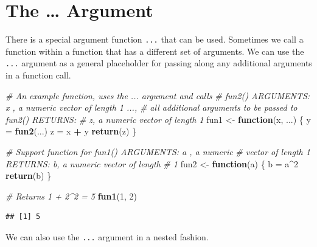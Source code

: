 \documentclass[
]{book}
\newenvironment{Shaded}{\begin{snugshade}}{\end{snugshade}}
\newcommand{\CommentTok}[1]{\textcolor[rgb]{0.56,0.35,0.01}{\textit{#1}}}
\newcommand{\ControlFlowTok}[1]{\textcolor[rgb]{0.13,0.29,0.53}{\textbf{#1}}}
\newcommand{\DecValTok}[1]{\textcolor[rgb]{0.00,0.00,0.81}{#1}}
\newcommand{\KeywordTok}[1]{\textcolor[rgb]{0.13,0.29,0.53}{\textbf{#1}}}
\newcommand{\NormalTok}[1]{#1}
\newcommand{\OperatorTok}[1]{\textcolor[rgb]{0.81,0.36,0.00}{\textbf{#1}}}
\newcommand{\StringTok}[1]{\textcolor[rgb]{0.31,0.60,0.02}{#1}}
\begin{document}
\hypertarget{the-argument}{%
\section{The \ldots{} Argument}\label{the-argument}}

There is a special argument function \texttt{...} that can be used. Sometimes we call a function within a function that has a different set of arguments. We can use the \texttt{...} argument as a general placeholder for passing along any additional arguments in a function call.

\begin{Shaded}
\begin{Highlighting}[]
\CommentTok{# An example function, uses the ... argument and calls}
\CommentTok{# fun2() ARGUMENTS: x , a numeric vector of length 1 ...,}
\CommentTok{# all additional arguments to be passed to fun2() RETURNS:}
\CommentTok{# z, a numeric vector of length 1}
\NormalTok{fun1 <-}\StringTok{ }\ControlFlowTok{function}\NormalTok{(x, ...) \{}
\NormalTok{    y =}\StringTok{ }\KeywordTok{fun2}\NormalTok{(...)}
\NormalTok{    z =}\StringTok{ }\NormalTok{x }\OperatorTok{+}\StringTok{ }\NormalTok{y}
    \KeywordTok{return}\NormalTok{(z)}
\NormalTok{\}}

\CommentTok{# Support function for fun1() ARGUMENTS: a , a numeric}
\CommentTok{# vector of length 1 RETURNS: b, a numeric vector of length}
\CommentTok{# 1}
\NormalTok{fun2 <-}\StringTok{ }\ControlFlowTok{function}\NormalTok{(a) \{}
\NormalTok{    b =}\StringTok{ }\NormalTok{a}\OperatorTok{^}\DecValTok{2}
    \KeywordTok{return}\NormalTok{(b)}
\NormalTok{\}}

\CommentTok{# Returns 1 + 2^2 = 5}
\KeywordTok{fun1}\NormalTok{(}\DecValTok{1}\NormalTok{, }\DecValTok{2}\NormalTok{)}
\end{Highlighting}
\end{Shaded}

\begin{verbatim}
## [1] 5
\end{verbatim}

We can also use the \texttt{...} argument in a nested fashion.
\end{document}
